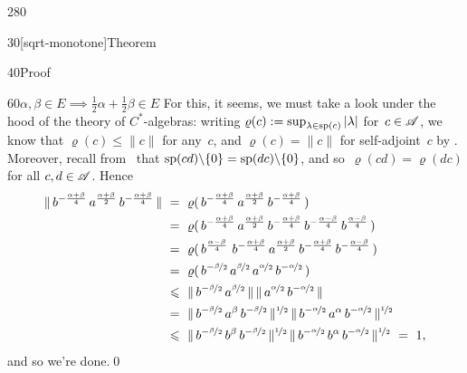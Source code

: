 \begin{parsec}{280}
\begin{point}{30}[sqrt-monotone]{Theorem}
\begin{point}{40}{Proof}
\begin{point}{60}{$\alpha,\beta\in E\implies \frac{1}{2}\alpha+\frac{1}{2}\beta
	\in E$}
For this, it seems, we must take a look under the hood
of the theory of $C^*$-algebras:
writing $\varrho(c):=\sup_{\lambda\in \mathrm{sp}(c)}\left|\lambda \right|$
for~$c\in \mathscr{A}$,
we know that $\varrho(c)\leq \|c\|$ for any~$c$,
and $\varrho(c)=\|c\|$ for self-adjoint~$c$ by .
Moreover, recall from~
that $\mathrm{sp}(cd)\backslash\{0\}
=\mathrm{sp}(dc)\backslash\{0\}$,
and so~$\varrho(cd)=\varrho(dc)$
for all $c,d\in \mathscr{A}$.
Hence
\begin{alignat*}{3}
\|\,b^{-\frac{\alpha+\beta}{4}}\,a^{\frac{\alpha+\beta}{2}}\,
b^{-\frac{\alpha+\beta}{4}}\,\| 
\ &=\ 
\varrho(\,b^{-\frac{\alpha+\beta}{4}}\,a^{\frac{\alpha+\beta}{2}}\,
b^{-\frac{\alpha+\beta}{4}} \,) \\
&=\ 
\varrho(\,b^{-\frac{\alpha+\beta}{4}}\,a^{\frac{\alpha+\beta}{2}}\,
b^{-\frac{\alpha+\beta}{4}} \,b^{-\frac{\alpha-\beta}{4}}
\,b^{\frac{\alpha-\beta}{4}}\,) \\
&=\ 
\varrho(
\,b^{\frac{\alpha-\beta}{4}}\,
\,b^{-\frac{\alpha+\beta}{4}}\,a^{\frac{\alpha+\beta}{2}}\,
b^{-\frac{\alpha+\beta}{4}} \,b^{-\frac{\alpha-\beta}{4}}\,)\\
&=\ 
\varrho(
\,b^{-\nicefrac{\beta}{2}}\,a^{\nicefrac{\beta}{2}}\,
a^{\nicefrac{\alpha}{2}}\,
b^{-\nicefrac{\alpha}{2}} \,) \\
&\leq\ 
\|\,b^{-\nicefrac{\beta}{2}}\,a^{\nicefrac{\beta}{2}}\,\|
\,\|\,
a^{\nicefrac{\alpha}{2}}\,
b^{-\nicefrac{\alpha}{2}} \,\|\\
&=\ 
\|\,b^{-\nicefrac{\beta}{2}}\,a^{\beta}\,
b^{-\nicefrac{\beta}{2}}\,\|^{\nicefrac{1}{2}}
\,\|\,
b^{-\nicefrac{\alpha}{2}} \,a^\alpha\,
b^{-\nicefrac{\alpha}{2}} \,\|^{\nicefrac{1}{2}}\\
\ &\leq\ 
\|\,b^{-\nicefrac{\beta}{2}}\,b^{\beta}\,
b^{-\nicefrac{\beta}{2}}\,\|^{\nicefrac{1}{2}}
\,\|\,
b^{-\nicefrac{\alpha}{2}} \,b^\alpha\,
b^{-\nicefrac{\alpha}{2}} \,\|^{\nicefrac{1}{2}} \ = \ 1,
\end{alignat*}
and so we're done.\qed
\end{point}%
\end{point}%
\end{point}%
\end{parsec}%
